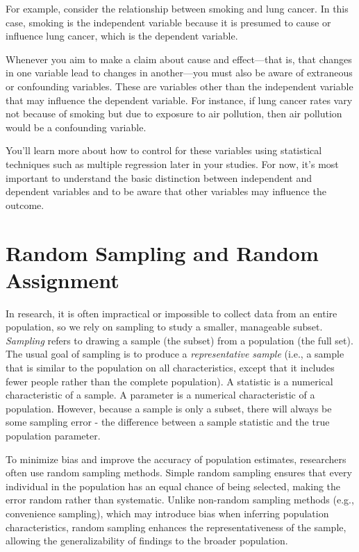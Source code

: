 \documentclass[
  letterpaper,
  DIV=11,
  numbers=noendperiod]{scrreprt}
\begin{document}
For example, consider the relationship between smoking and lung cancer.
In this case, smoking is the independent variable because it is presumed
to cause or influence lung cancer, which is the dependent variable.

Whenever you aim to make a claim about cause and effect---that is, that
changes in one variable lead to changes in another---you must also be
aware of extraneous or confounding variables. These are variables other
than the independent variable that may influence the dependent variable.
For instance, if lung cancer rates vary not because of smoking but due
to exposure to air pollution, then air pollution would be a confounding
variable.

You'll learn more about how to control for these variables using
statistical techniques such as multiple regression later in your
studies. For now, it's most important to understand the basic
distinction between independent and dependent variables and to be aware
that other variables may influence the outcome.

\section{Random Sampling and Random
Assignment}\label{random-sampling-and-random-assignment}

In research, it is often impractical or impossible to collect data from
an entire population, so we rely on sampling to study a smaller,
manageable subset. \emph{Sampling} refers to drawing a sample (the
subset) from a population (the full set). The usual goal of sampling is
to produce a \emph{representative sample} (i.e., a sample that is
similar to the population on all characteristics, except that it
includes fewer people rather than the complete population). A statistic
is a numerical characteristic of a sample. A parameter is a numerical
characteristic of a population. However, because a sample is only a
subset, there will always be some sampling error - the difference
between a sample statistic and the true population parameter.

To minimize bias and improve the accuracy of population estimates,
researchers often use random sampling methods. Simple random sampling
ensures that every individual in the population has an equal chance of
being selected, making the error random rather than systematic. Unlike
non-random sampling methods (e.g., convenience sampling), which may
introduce bias when inferring population characteristics, random
sampling enhances the representativeness of the sample, allowing the
generalizability of findings to the broader population.
\end{document}
